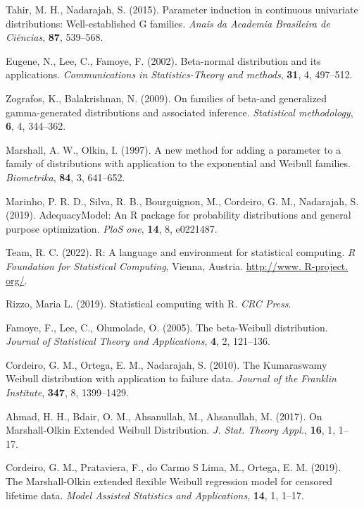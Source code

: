 \documentclass[twoside,leqno,11pt]{article}
\begin{document}
\begin{thebibliography}{8}

 Tahir, M. H., Nadarajah, S. (2015).  Parameter induction in continuous univariate distributions: Well-established G families. \textit{Anais da Academia Brasileira de Ciências}, {\bf 87}, 539--568.

 Eugene, N., Lee, C.,  Famoye, F. (2002). Beta-normal distribution and its applications. \textit{Communications in Statistics-Theory and methods}, {\bf 31}, 4, 497--512.

 Zografos, K., Balakrishnan, N. (2009). On families of beta-and generalized gamma-generated distributions and associated inference. \textit{Statistical methodology}, {\bf 6}, 4, 344--362.

 Marshall, A. W.,  Olkin, I. (1997).  A new method for adding a parameter to a family of distributions with application to the exponential and Weibull families. \textit{Biometrika}, {\bf 84}, 3, 641--652.

 Marinho, P. R. D., Silva, R. B., Bourguignon, M., Cordeiro, G. M.,  Nadarajah, S. (2019). AdequacyModel: An R package for probability distributions and general purpose optimization. \textit{PloS one}, {\bf 14}, 8, e0221487.

 Team, R. C. (2022). R: A language and environment for statistical computing. \textit{R Foundation for Statistical Computing}, Vienna, Austria. \url{http://www. R-project. org/}.

 Rizzo, Maria L. (2019). Statistical computing with R. \textit{CRC Press}.

 Famoye, F., Lee, C., Olumolade, O. (2005). The beta-Weibull distribution. \textit{Journal of Statistical Theory and Applications}, {\bf 4}, 2, 121--136.

 Cordeiro, G. M., Ortega, E. M., Nadarajah, S. (2010). The Kumaraswamy Weibull distribution with application to failure data. \textit{Journal of the Franklin Institute}, {\bf 347}, 8, 1399--1429.

 Ahmad, H. H., Bdair, O. M., Ahsanullah, M.,  Ahsanullah, M. (2017). On Marshall-Olkin Extended Weibull Distribution. \textit{J. Stat. Theory Appl.}, {\bf 16}, 1, 1--17.

 Cordeiro, G. M., Prataviera, F., do Carmo S Lima, M., Ortega, E. M. (2019). The Marshall-Olkin extended flexible Weibull regression model for censored lifetime data. \textit{Model Assisted Statistics and Applications}, {\bf 14}, 1, 1--17.


\end{thebibliography}
\end{document}
